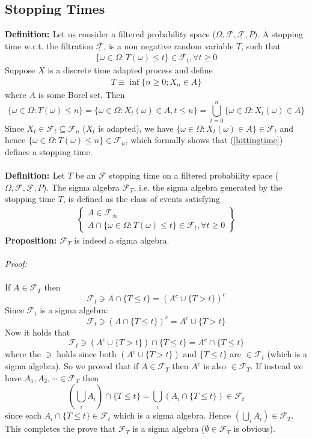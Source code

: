 \documentclass[a4paper,10pt]{report}
\theoremstyle{plain}
\theoremstyle{definition}
\newcommand\be{\begin{eqnarray}}    %
\newcommand\ee{\end{eqnarray}}
\newcommand{\DEF} {{\bf{Definition: }}}
\newcommand{\PROP} {{\bf{Proposition: }}}
\newcommand{\PROOF} {{\emph{Proof: \\ \\}}}
\newcommand{\FF} {\mathcal{F} }
\newcommand{\FLT} {\underline{\mathcal{F}}}
\begin{document}
\subsection{Stopping Times}
\DEF Let us consider a filtered probability space ($\Omega, \FF, \FLT, P$). A stopping time w.r.t. the filtration $\FLT$, is a non negative random variable $T$, such that
\be 
\{\omega\in \Omega: T(\omega)\leq t\}\in \FF_t, \forall t\geq 0
\label{stoppingtime}
\ee
Suppose $X$ is a discrete time adapted process and define 
\be
T\equiv \inf\{n\geq 0; X_n\in A\}
\label{hittingtime}
\ee
where $A$ is some Borel set.
Then
\[
\{\omega\in \Omega: T(\omega)\leq n\}=\{\omega\in \Omega: X_t(\omega)\in A, t\leq n\}=\bigcup_{t=0}^n\{\omega\in \Omega: X_t(\omega)\in A\}
\]
Since $X_t\in \FF_t\subseteq \FF_n$ ($X_t$ is adapted), we have $\{\omega\in \Omega: X_t(\omega)\in A\}\in \FF_t$ and hence $\{\omega\in \Omega: T(\omega)\leq n\}\in \FF_n$, which formally shows that (\ref{hittingtime}) defines a stopping time.\\ \\
\DEF Let $T$ be an $\FLT$ stopping time on a filtered probability space ($\Omega, \FF, \FLT, P$). The sigma algebra $\FF_T$, i.e. the sigma algebra generated by the stopping time $T$, is defined as the class of events satisfying 
\be 
\begin{Bmatrix}
A\in \FF_\infty \\ 
A\cap \{\omega\in \Omega: T(\omega)\leq t\} \in \FF_t, \forall t\geq 0 
\label{sigmaalgebrastoppingtime}
\end{Bmatrix}
\ee
\PROP $\FF_T$ is indeed a sigma algebra.\\ \\
\PROOF
If $A\in \FF_T$ then
\[
\FF_t \ni A \cap \{T\leq t\}=(A^c\cup \{T>t\})^c
\]
Since $\FF_t$ is a sigma algebra:
\[
\FF_t \ni (A \cap \{T\leq t\})^c=A^c\cup \{T>t\}
\]
Now it holds that 
\[
\FF_t \ni(A^c\cup \{T>t\})\cap  \{T\leq t\}=A^c \cap \{T\leq t\}
\]
where the $\ni$ holds since both $(A^c\cup \{T>t\})$ and $\{T\leq t\}$ are $\in \FF_t$ (which is a sigma algebra).
So we proved that if $A\in \FF_T$ then $A^c$ is also $\in \FF_T$. If instead we have $A_1,A_2,\cdots \in \FF_T$ then 
\[
\left(\bigcup_{i}A_i\right) \cap \{T\leq t\}=\bigcup_{i}\left(A_i \cap \{T\leq t\}\right)\in \FF_t
\]
since each $A_i \cap \{T\leq t\}\in \FF_t$ which is a sigma algebra. Hence $\left(\bigcup_{i}A_i\right)\in \FF_T$. This completes the prove that $\FF_T$ is a sigma algebra ($\emptyset \in \FF_T$ is obvious).\\ \\
\end{document}
